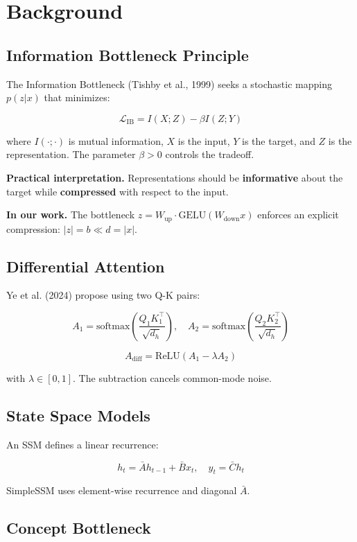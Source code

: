 \section{Background}

\subsection{Information Bottleneck Principle}

The Information Bottleneck (Tishby et al., 1999) seeks a stochastic 
mapping $p(z | x)$ that minimizes:

\[
\mathcal{L}_\text{IB} = I(X; Z) - \beta I(Z; Y)
\tag{3.1}
\]

where $I(\cdot; \cdot)$ is mutual information, $X$ is the input, $Y$ is 
the target, and $Z$ is the representation. The parameter $\beta > 0$ 
controls the tradeoff.

\textbf{Practical interpretation.} Representations should be \textbf{informative} 
about the target while \textbf{compressed} with respect to the input.

\textbf{In our work.} The bottleneck $z = W_\text{up} \cdot \text{GELU}(W_\text{down} x)$ 
enforces an explicit compression: $|z| = b \ll d = |x|$.

\subsection{Differential Attention}

Ye et al. (2024) propose using two Q-K pairs:

\[
A_1 = \text{softmax}\!\left(\frac{Q_1 K_1^\top}{\sqrt{d_h}}\right), \quad
A_2 = \text{softmax}\!\left(\frac{Q_2 K_2^\top}{\sqrt{d_h}}\right)
\tag{3.2}
\]

\[
A_\text{diff} = \text{ReLU}(A_1 - \lambda A_2)
\tag{3.3}
\]

with $\lambda \in [0, 1]$. The subtraction cancels common-mode noise.

\subsection{State Space Models}

An SSM defines a linear recurrence:

\[
h_t = \bar{A} h_{t-1} + \bar{B} x_t, \quad
y_t = \bar{C} h_t
\tag{3.4}
\]

SimpleSSM uses element-wise recurrence and diagonal $\bar{A}$.

\subsection{Concept Bottleneck}

